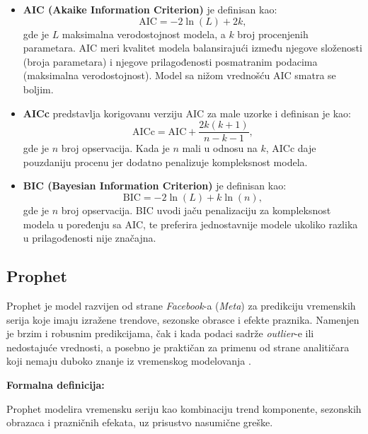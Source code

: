 \documentclass[12pt]{article}
\begin{document}
\begin{itemize}
    \item \textbf{AIC (Akaike Information Criterion)} je definisan kao:
    \begin{equation}
        \mathrm{AIC} = -2 \ln(L) + 2k,
    \end{equation}
    gde je $L$ maksimalna verodostojnost modela, a $k$ broj procenjenih parametara. AIC meri kvalitet modela balansirajući između njegove složenosti (broja parametara) i njegove prilagođenosti posmatranim podacima (maksimalna verodostojnost). Model sa nižom vrednošću AIC smatra se boljim.

    \item \textbf{AICc} predstavlja korigovanu verziju AIC za male uzorke i definisan je kao:
    \begin{equation}
        \mathrm{AICc} = \mathrm{AIC} + \frac{2k(k+1)}{n - k - 1},
    \end{equation}
    gde je $n$ broj opservacija. Kada je $n$ mali u odnosu na $k$, AICc daje pouzdaniju procenu jer dodatno penalizuje kompleksnost modela.

    \item \textbf{BIC (Bayesian Information Criterion)} je definisan kao:
    \begin{equation}
        \mathrm{BIC} = -2 \ln(L) + k \ln(n),
    \end{equation}
    gde je $n$ broj opservacija. BIC uvodi jaču penalizaciju za kompleksnost modela u poređenju sa AIC, te preferira jednostavnije modele ukoliko razlika u prilagođenosti nije značajna.
\end{itemize}


\subsection{Prophet}

Prophet je model razvijen od strane \textit{Facebook}-a (\textit{Meta}) za predikciju vremenskih serija koje imaju izražene trendove, sezonske obrasce i efekte praznika. Namenjen je brzim i robusnim predikcijama, čak i kada podaci sadrže \textit{outlier}-e ili nedostajuće vrednosti, a posebno je praktičan za primenu od strane analitičara koji nemaju duboko znanje iz vremenskog modelovanja \cite{taylor2018}.

\textbf{Formalna definicija:}

Prophet modelira vremensku seriju kao kombinaciju trend komponente, sezonskih obrazaca i prazničnih efekata, uz prisustvo nasumične greške.
\end{document}
